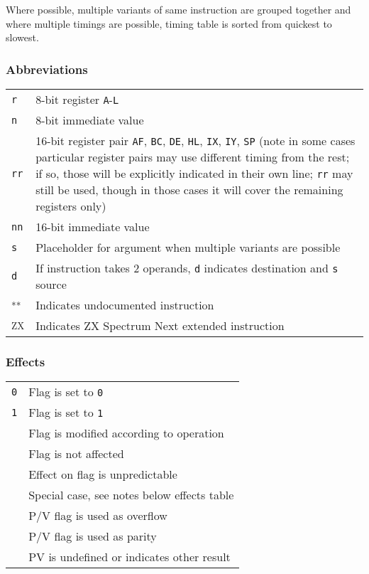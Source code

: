 \documentclass[12pt,twoside,openright,a4paper]{book}
\newcommand{\UNDOC}{\textnormal{\textsuperscript{**}}}
\newcommand{\ZXN}{\textnormal{\textsuperscript{ZX}}}
\begin{document}
Where possible, multiple variants of same instruction are grouped together and where multiple timings are possible, timing table is sorted from quickest to slowest.

\pagebreak

\subsubsection{Abbreviations}

\begin{tabularx}{\textwidth}{lX}
	{\tt r} & 
		8-bit register {\tt A}-{\tt L} \\
	{\tt n} &
		8-bit immediate value \\
	{\tt rr} & 
		16-bit register pair {\tt AF}, {\tt BC}, {\tt DE}, {\tt HL}, {\tt IX}, {\tt IY}, {\tt SP} (note in some cases particular register pairs may use different timing from the rest; if so, those will be explicitly indicated in their own line; {\tt rr} may still be used, though in those cases it will cover the remaining registers only) \\
	{\tt nn} & 
		16-bit immediate value \\
	{\tt s} &
		Placeholder for argument when multiple variants are possible \\
	{\tt d} &
		If instruction takes 2 operands, {\tt d} indicates destination and {\tt s} source \\
	\UNDOC & Indicates undocumented instruction \\
	\ZXN & Indicates ZX Spectrum Next extended instruction \\		
\end{tabularx}

\subsubsection{Effects}

\begin{tabular}{cl}
	{\tt 0} & Flag is set to {\tt 0} \\
	{\tt 1} & Flag is set to {\tt 1} \\
	{\tt \FS} & Flag is modified according to operation \\
	{\tt \FN} & Flag is not affected \\
	{\tt \FU} & Effect on flag is unpredictable \\
	{\tt \FX} & Special case, see notes below effects table \\
	\DetailParityOverflow{v} & P/V flag is used as overflow \\
	\DetailParityOverflow{p} & P/V flag is used as parity \\
	\DetailParityOverflow{} & PV is undefined or indicates other result \\
\end{tabular}
\end{document}
